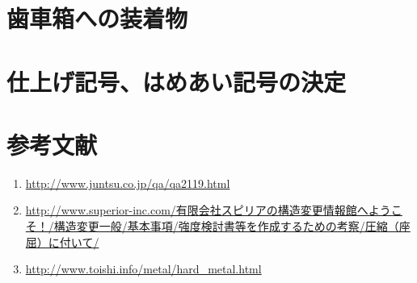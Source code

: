 \documentclass[a4j,twoside,openright,11pt]{jreport}
\begin{document}
\section{歯車箱への装着物}
\section{仕上げ記号、はめあい記号の決定}

\section{参考文献}
\begin{enumerate}
\item \url{http://www.juntsu.co.jp/qa/qa2119.html}
\item \url{http://www.superior-inc.com/有限会社スピリアの構造変更情報館へようこそ！/構造変更一般/基本事項/強度検討書等を作成するための考察/圧縮（座屈）に付いて/}
\item \url{http://www.toishi.info/metal/hard_metal.html}
\end{enumerate}
\end{document}

